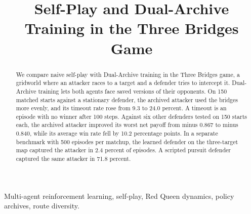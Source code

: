 \documentclass[conference,a4paper]{IEEEtran}
\begin{document}
\title{Self-Play and Dual-Archive Training in the Three Bridges Game}

\author{
\and
{}
\and
{}
\and
{}
}

\maketitle

\begin{abstract}
We compare naive self-play with Dual-Archive training in the Three Bridges game, a gridworld where an attacker races to a target and a defender tries to intercept it. Dual-Archive training lets both agents face saved versions of their opponents. On 150 matched starts against a stationary defender, the archived attacker used the bridges more evenly, and its timeout rate rose from 9.3 to 24.0 percent. A timeout is an episode with no winner after 100 steps. Against six other defenders tested on 150 starts each, the archived attacker improved its worst net payoff from minus 0.867 to minus 0.840, while its average win rate fell by 10.2 percentage points. In a separate benchmark with 500 episodes per matchup, the learned defender on the three-target map captured the attacker in 2.4 percent of episodes. A scripted pursuit defender captured the same attacker in 71.8 percent.
\end{abstract}

\begin{IEEEkeywords}
Multi-agent reinforcement learning, self-play, Red Queen dynamics, policy archives, route diversity.
\end{IEEEkeywords}
\end{document}
